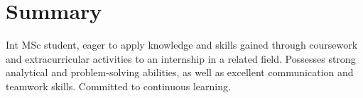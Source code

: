 
\section{Summary}
Int MSc student,  eager to apply knowledge and skills gained through coursework and extracurricular activities to an internship in a related field.
Possesses strong analytical and problem-solving abilities, as well as excellent communication and teamwork skills. Committed to continuous learning.

